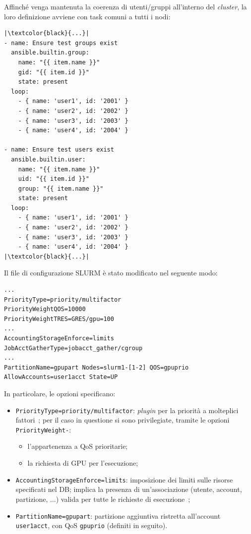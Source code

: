 \documentclass[12pt,a4paper,twoside,openright]{book}
\begin{document}
Affinché venga mantenuta la coerenza di utenti/gruppi all'interno del \textit{cluster}, la loro definizione avviene con task comuni a tutti i nodi:
\begin{verbatim}
|\textcolor{black}{...}|
- name: Ensure test groups exist
  ansible.builtin.group:
    name: "{{ item.name }}"
    gid: "{{ item.id }}"
    state: present
  loop:
    - { name: 'user1', id: '2001' }
    - { name: 'user2', id: '2002' }
    - { name: 'user3', id: '2003' }
    - { name: 'user4', id: '2004' }

- name: Ensure test users exist
  ansible.builtin.user:
    name: "{{ item.name }}"
    uid: "{{ item.id }}"
    group: "{{ item.name }}"
    state: present
  loop:
    - { name: 'user1', id: '2001' }
    - { name: 'user2', id: '2002' }
    - { name: 'user3', id: '2003' }
    - { name: 'user4', id: '2004' }
|\textcolor{black}{...}|
\end{verbatim}
Il file di configurazione \ac{SLURM} è stato modificato nel seguente modo:
\begin{verbatim}
...
PriorityType=priority/multifactor
PriorityWeightQOS=10000
PriorityWeightTRES=GRES/gpu=100
...
AccountingStorageEnforce=limits
JobAcctGatherType=jobacct_gather/cgroup
...
PartitionName=gpupart Nodes=slurm1-[1-2] QOS=gpuprio AllowAccounts=user1acct State=UP
\end{verbatim}
In particolare, le opzioni specificano:
\begin{itemize}
    \item \texttt{PriorityType=priority/multifactor}: \textit{plugin} per la priorità a molteplici fattori~\cite{slurmmultifactor}; per il caso in questione si sono privilegiate, tramite le opzioni\\ \texttt{PriorityWeight-}:
    \begin{itemize}
        \item l'appartenenza a \acf{QoS} prioritarie;
        \item la richiesta di \ac{GPU} per l'esecuzione;
    \end{itemize}
    \item \texttt{AccountingStorageEnforce=limits}: imposizione dei limiti sulle risorse specificati nel \ac{DB}; implica la presenza di un'associazione (utente, account, partizione, ...) valida per tutte le richieste di esecuzione~\cite{slurmlimits};
    \item \texttt{PartitionName=gpupart}: partizione aggiuntiva ristretta all'account \texttt{user1acct}, con \ac{QoS} \texttt{gpuprio} (definiti in seguito).
\end{itemize}
\end{document}
